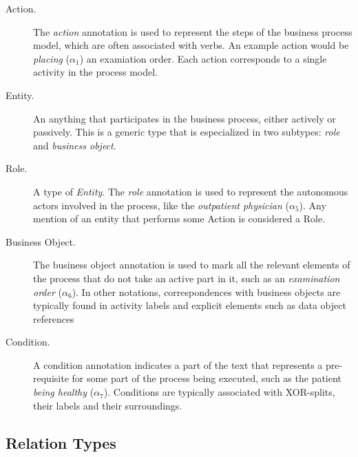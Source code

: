 \begin{description}
\item[Action.]{The \emph{action} annotation is used to represent the steps of the
    business process model, which are often associated with verbs. An example action
    would be \emph{placing} ($\alpha_1$) an examiation order. Each action
    corresponds to a single activity in the process model.}
\item[Entity.]{An anything that participates in the business process, either
    actively or passively. This is a generic type that is especialized in two
    subtypes: \emph{role} and \emph{business object}.}
\item[Role.]{A type of \emph{Entity}. The \emph{role} annotation is used to
    represent the autonomous actors involved in the process, like the
    \emph{outpatient physician} ($\alpha_5$). Any mention of an entity that
    performs some Action is considered a Role.}
\item[Business Object.]{The business object annotation is used to mark all the 
    relevant elements of the process that do not take an active part in it, such as 
    an \emph{examination order} ($\alpha_6$).
    In other notations, correspondences with business objects are typically
    found in activity labels and explicit elements such as data object references}
\item[Condition.]{A condition annotation indicates a part of the text that
    represents a pre-requisite for some part of the process being executed, such 
    as the patient \emph{being healthy} ($\alpha_7$). Conditions are typically 
    associated with XOR-splits, their labels and their surroundings.}
\end{description}

%

\subsection{Relation Types}
\label{sec:atd_relations}


